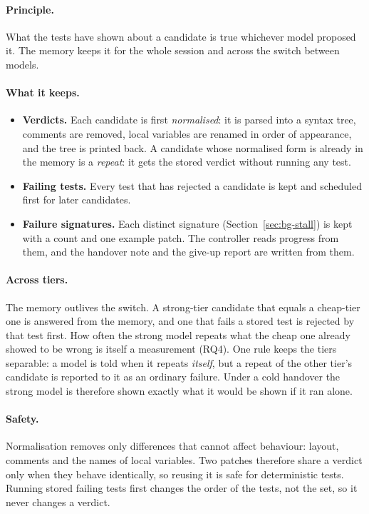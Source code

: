 \paragraph{Principle.} What the tests have shown about a candidate is true
whichever model proposed it. The memory keeps it for the whole session and
across the switch between models.

\paragraph{What it keeps.}
\begin{itemize}
\item \textbf{Verdicts.} Each candidate is first \emph{normalised}: it is
parsed into a syntax tree, comments are removed, local variables are renamed
in order of appearance, and the tree is printed back. A candidate whose
normalised form is already in the memory is a \emph{repeat}: it gets the
stored verdict without running any test.
\item \textbf{Failing tests.} Every test that has rejected a candidate is kept
and scheduled first for later candidates.
\item \textbf{Failure signatures.} Each distinct signature
(Section~\ref{sec:bg-stall}) is kept with a count and one example patch. The
controller reads progress from them, and the handover note and the give-up
report are written from them.
\end{itemize}

\paragraph{Across tiers.} The memory outlives the switch. A strong-tier
candidate that equals a cheap-tier one is answered from the memory, and one
that fails a stored test is rejected by that test first. How often the strong
model repeats what the cheap one already showed to be wrong is itself a
measurement (RQ4). One rule keeps the tiers separable: a model is told when it
repeats \emph{itself}, but a repeat of the other tier's candidate is reported
to it as an ordinary failure. Under a cold handover the strong model is
therefore shown exactly what it would be shown if it ran alone.

\paragraph{Safety.} Normalisation removes only differences that cannot affect
behaviour: layout, comments and the names of local variables. Two patches
therefore share a verdict only when they behave identically, so reusing it is
safe for deterministic tests. Running stored failing tests first changes the
order of the tests, not the set, so it never changes a verdict.

